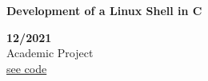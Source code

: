 \begin{minipage}{0.8\textwidth}
    \parbox{0.8\linewidth}{\textbf{Development of a Linux Shell in C}} \hfill \textbf{12/2021}\\
    Academic Project\\
    \href{https://github.com/geeksLabTech/SO_Shell}{see code}\\
    \end{minipage} \hfill {}\\\\